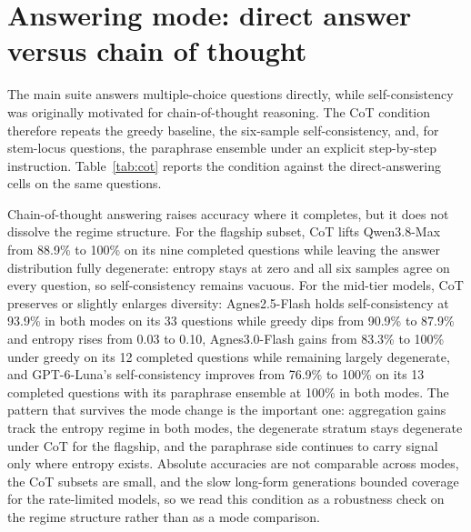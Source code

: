 \section{Answering mode: direct answer versus chain of thought}
\setcounter{table}{0}
\label{app:cot}
\label{sec:cot}

The main suite answers multiple-choice questions directly, while self-consistency was originally motivated for chain-of-thought reasoning. The CoT condition therefore repeats the greedy baseline, the six-sample self-consistency, and, for stem-locus questions, the paraphrase ensemble under an explicit step-by-step instruction. Table~\ref{tab:cot} reports the condition against the direct-answering cells on the same questions.

\begin{table}[htbp]
\centering
\footnotesize
\caption{Chain-of-thought condition on multiple-choice questions: accuracy under greedy, SC-6, and PE-6 with CoT against the same conditions under direct answering on identical questions (Grd$_{dir}$, SC$_{dir}$, PE$_{dir}$), with mean answer entropy under both modes.}
\label{tab:cot}

\end{table}

Chain-of-thought answering raises accuracy where it completes, but it does not dissolve the regime structure. For the flagship subset, CoT lifts Qwen3.8-Max from 88.9\% to 100\% on its nine completed questions while leaving the answer distribution fully degenerate: entropy stays at zero and all six samples agree on every question, so self-consistency remains vacuous. For the mid-tier models, CoT preserves or slightly enlarges diversity: Agnes2.5-Flash holds self-consistency at 93.9\% in both modes on its 33 questions while greedy dips from 90.9\% to 87.9\% and entropy rises from 0.03 to 0.10, Agnes3.0-Flash gains from 83.3\% to 100\% under greedy on its 12 completed questions while remaining largely degenerate, and GPT-6-Luna's self-consistency improves from 76.9\% to 100\% on its 13 completed questions with its paraphrase ensemble at 100\% in both modes. The pattern that survives the mode change is the important one: aggregation gains track the entropy regime in both modes, the degenerate stratum stays degenerate under CoT for the flagship, and the paraphrase side continues to carry signal only where entropy exists. Absolute accuracies are not comparable across modes, the CoT subsets are small, and the slow long-form generations bounded coverage for the rate-limited models, so we read this condition as a robustness check on the regime structure rather than as a mode comparison.
